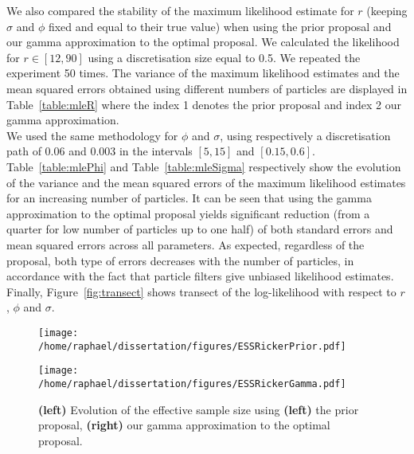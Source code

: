 \documentclass[12pt]{article}
\begin{document}
	We also compared the stability of the maximum likelihood estimate for $r$ (keeping $\sigma$ and $\phi$ fixed and equal to their true value) when using the prior proposal and our gamma approximation to the optimal proposal. We calculated the likelihood for $r \in [12, 90]$ using a discretisation size equal to 0.5. We repeated the experiment 50 times. The variance of the maximum likelihood estimates and the mean squared errors obtained using different numbers of particles are displayed in Table~\ref{table:mleR} where the index 1 denotes the prior proposal and index 2 our gamma approximation. \\
	We used the same methodology for $\phi$ and $\sigma$, using respectively a discretisation path of 0.06 and 0.003 in the intervals $[5, 15]$ and $[0.15, 0.6]$. Table~\ref{table:mlePhi} and Table~\ref{table:mleSigma} respectively show the evolution of the variance and the mean squared errors of the maximum likelihood estimates for an increasing number of particles. It can be seen that using the gamma approximation to the optimal proposal yields significant reduction (from a quarter for low number of particles up to one half) of both standard errors and mean squared errors across all parameters. As expected, regardless of the proposal, both type of errors decreases with the number of particles, in accordance with the fact that particle filters give unbiased likelihood estimates.  Finally, Figure~\ref{fig:transect} shows transect of the log-likelihood with respect to $r$, $\phi$ and $\sigma$.
	
	\begin{figure}[htb]
		\centering
		\vspace{5mm}
		\begin{minipage}{0.49\textwidth}
			\centering
			\texttt{[image: /home/raphael/dissertation/figures/ESSRickerPrior.pdf]}
		\end{minipage}
		\begin{minipage}{0.49\textwidth}
			\centering
			\texttt{[image: /home/raphael/dissertation/figures/ESSRickerGamma.pdf]}
		\end{minipage}
		\caption[ESS of the particle filter used for the Ricker model depending on which proposal is used]{\textbf{(left)} Evolution of the effective sample size using \textbf{(left)} the prior proposal, \textbf{(right)} our gamma approximation to the optimal proposal.}
		\label{fig:essRicker}
		\vspace{5mm}
	\end{figure}
	 
\end{document}
